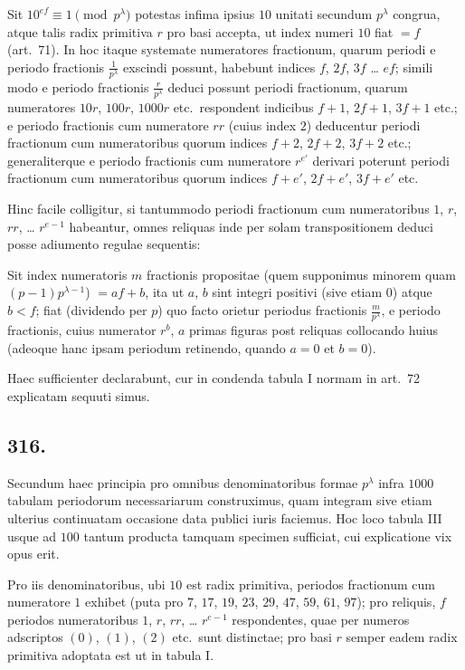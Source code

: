 \documentclass[12pt,a4paper]{article}
\theoremstyle{plain}
\theoremstyle{definition}
\theoremstyle{remark}
\begin{document}
Sit $10^{ef} \equiv 1 \pmod{p^\lambda}$ potestas infima ipsius $10$ unitati secundum
$p^\lambda$ congrua, atque talis radix primitiva $r$ pro basi accepta, ut index numeri
$10$ fiat $= f$ (art.\@~71). In hoc itaque systemate numeratores fractionum,
quarum periodi e periodo fractionis $\tfrac{1}{p^\lambda}$ exscindi possunt, habebunt indices
$f$, $2f$, $3f$ \ldots{} $ef$; simili modo e periodo fractionis $\tfrac{r}{p^\lambda}$ deduci possunt
periodi fractionum, quarum numeratores $10r$, $100r$, $1000r$ etc.\ respondent
indicibus $f+1$, $2f+1$, $3f+1$ etc.; e periodo fractionis cum numeratore
$rr$ (cuius index $2$) deducentur periodi fractionum cum numeratoribus quorum
indices $f+2$, $2f+2$, $3f+2$ etc.; generaliterque e periodo fractionis cum
numeratore $r^{e'}$ derivari poterunt periodi fractionum cum numeratoribus quorum
indices $f+e'$, $2f+e'$, $3f+e'$ etc.

Hinc facile colligitur, si tantummodo periodi fractionum cum numeratoribus
$1$, $r$, $rr$, \ldots{} $r^{e-1}$ habeantur, omnes reliquas inde per solam transpositionem
deduci posse adiumento regulae sequentis:

Sit index numeratoris $m$ fractionis propositae (quem supponimus minorem
quam $(p-1)p^{\lambda-1}$) $= af + b$, ita ut $a$, $b$ sint integri positivi (sive etiam $0$)
atque $b < f$; fiat (dividendo per $p$) quo facto orietur periodus fractionis
$\tfrac{m}{p^\lambda}$, e periodo fractionis, cuius numerator $r^b$, $a$ primas figuras post reliquas
collocando huius (adeoque hanc ipsam periodum retinendo, quando $a = 0$ et
$b = 0$).

Haec sufficienter declarabunt, cur in condenda tabula I normam in art.\@~72
explicatam sequuti simus.

\subsection*{316.}

Secundum haec principia pro omnibus denominatoribus formae $p^\lambda$ infra
$1000$ tabulam periodorum necessariarum construximus, quam integram sive
etiam ulterius continuatam occasione data publici iuris faciemus. Hoc loco
tabula III usque ad $100$ tantum producta tamquam specimen sufficiat, cui
explicatione vix opus erit.

Pro iis denominatoribus, ubi $10$ est radix primitiva, periodos fractionum
cum numeratore $1$ exhibet (puta pro $7$, $17$, $19$, $23$, $29$, $47$, $59$, $61$, $97$);
pro reliquis, $f$ periodos numeratoribus $1$, $r$, $rr$, \ldots{} $r^{e-1}$ respondentes, quae
per numeros adscriptos $(0)$, $(1)$, $(2)$ etc.\ sunt distinctae; pro basi $r$ semper
eadem radix primitiva adoptata est ut in tabula I.
\end{document}
